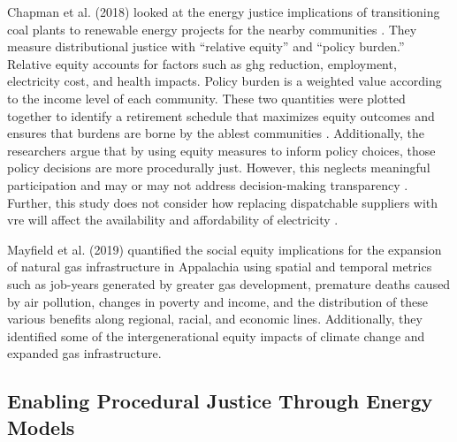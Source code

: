 Chapman et al. (2018) looked at the energy justice implications of transitioning coal
plants to renewable energy projects for the nearby communities \cite{chapman_prioritizing_2018}. 
They measure distributional justice with ``relative equity'' and ``policy burden.''
Relative equity accounts for factors such as \ac{ghg} reduction, employment, electricity
cost, and health impacts. Policy burden is a weighted value according to the income level 
of each community. These two quantities were plotted together to identify a retirement
schedule that maximizes equity outcomes and ensures that burdens are borne by the 
ablest communities \cite{chapman_prioritizing_2018}. Additionally, the researchers 
argue that by using equity measures to inform policy choices, those policy decisions are
more procedurally just. However, this neglects meaningful participation and may or
may not address decision-making transparency \cite{sovacool_energy_2015}. Further, this
study does not consider how replacing dispatchable suppliers with \ac{vre} will affect
the availability and affordability of electricity \cite{sovacool_energy_2015}.

Mayfield et al. (2019) quantified the social equity implications for the expansion
of natural gas infrastructure in Appalachia using spatial and temporal metrics such as 
job-years generated by greater gas development, premature deaths caused by air pollution, changes in poverty and income, and the distribution of these various benefits along 
regional, racial, and economic lines. Additionally, they identified some of the
intergenerational equity impacts of climate change and expanded gas infrastructure.

\subsection{Enabling Procedural Justice Through Energy Models}

